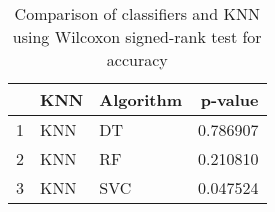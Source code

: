 \begin{table}
\footnotesize
\caption{Comparison of classifiers and KNN using Wilcoxon signed-rank test for accuracy}
\label{tab:KNN wilcoxon ACC comparison}
\begin{tabular}{lllr}
\hline
 & KNN & Algorithm & p-value \\
\hline
1 & KNN & DT & 0.786907 \\
2 & KNN & RF & 0.210810 \\
3 & KNN & SVC & 0.047524 \\
\hline
\end{tabular}
\end{table}
